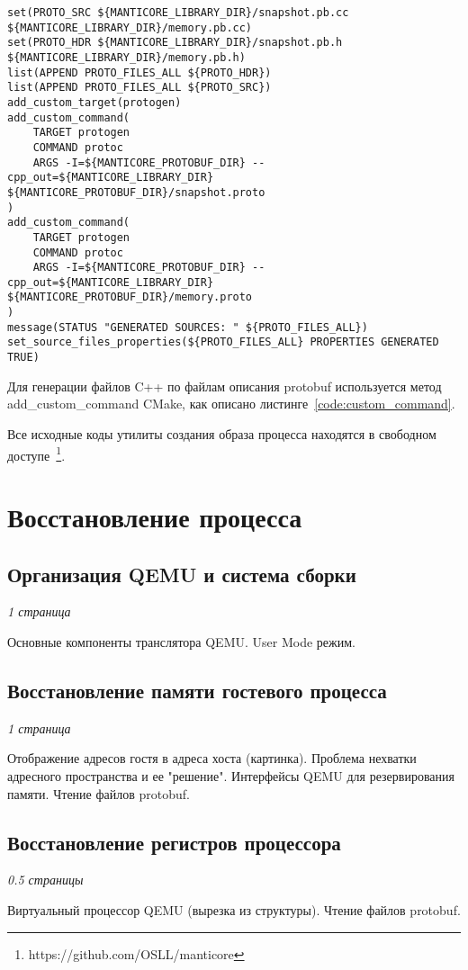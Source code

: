 \begin{lstlisting}[caption=Генерация исходных кодов по файлам описания protobuf, label=code:custom_command]
set(PROTO_SRC ${MANTICORE_LIBRARY_DIR}/snapshot.pb.cc ${MANTICORE_LIBRARY_DIR}/memory.pb.cc)
set(PROTO_HDR ${MANTICORE_LIBRARY_DIR}/snapshot.pb.h ${MANTICORE_LIBRARY_DIR}/memory.pb.h)
list(APPEND PROTO_FILES_ALL ${PROTO_HDR})
list(APPEND PROTO_FILES_ALL ${PROTO_SRC})
add_custom_target(protogen)
add_custom_command(
	TARGET protogen
	COMMAND protoc
	ARGS -I=${MANTICORE_PROTOBUF_DIR} --cpp_out=${MANTICORE_LIBRARY_DIR} ${MANTICORE_PROTOBUF_DIR}/snapshot.proto
)
add_custom_command(
	TARGET protogen
	COMMAND protoc
	ARGS -I=${MANTICORE_PROTOBUF_DIR} --cpp_out=${MANTICORE_LIBRARY_DIR} ${MANTICORE_PROTOBUF_DIR}/memory.proto
)
message(STATUS "GENERATED SOURCES: " ${PROTO_FILES_ALL})
set_source_files_properties(${PROTO_FILES_ALL} PROPERTIES GENERATED TRUE)
\end{lstlisting}

Для генерации файлов C++ по файлам описания protobuf используется метод add\_custom\_command CMake, как описано листинге~\ref{code:custom_command}.

Все исходные коды утилиты создания образа процесса находятся в свободном доступе~\footnote{https://github.com/OSLL/manticore}.

\section{Восстановление процесса}

\subsection{Организация QEMU и система сборки}

\textit{1 страница}

Основные компоненты транслятора QEMU. User Mode режим.

\subsection{Восстановление памяти гостевого процесса}

\textit{1 страница}

Отображение адресов гостя в адреса хоста (картинка). Проблема нехватки адресного пространства и ее "решение". Интерфейсы QEMU для резервирования памяти. Чтение файлов protobuf.

\subsection{Восстановление регистров процессора}

\textit{0.5 страницы}

Виртуальный процессор QEMU (вырезка из структуры). Чтение файлов protobuf.
